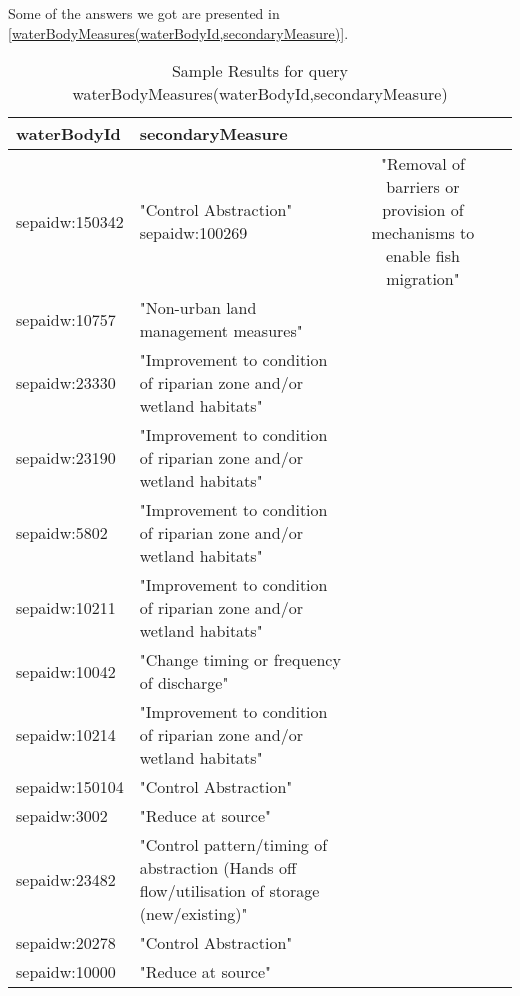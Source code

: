 \documentclass[a4paper,10pt]{article}
\begin{document}
Some of the answers we got are presented in  \ref{waterBodyMeasures(waterBodyId,secondaryMeasure)}. 

\begin{table}[!tb]

\caption{Sample Results for query waterBodyMeasures(waterBodyId,secondaryMeasure)}
\begin{center}
\begin{tabular}{llcr}
\hline
waterBodyId & secondaryMeasure \\ \hline 
sepaidw:150342 & "Control Abstraction"                                                                         
 sepaidw:100269 & "Removal of barriers or provision of mechanisms to enable fish migration"    \\                 
 sepaidw:10757  & "Non-urban land management measures"                                  \\                        
 sepaidw:23330  & "Improvement to condition of riparian zone and/or wetland habitats"     \\                     
sepaidw:23190  & "Improvement to condition of riparian zone and/or wetland habitats"       \\                   
 sepaidw:5802   & "Improvement to condition of riparian zone and/or wetland habitats"     \\                      
 sepaidw:10211  & "Improvement to condition of riparian zone and/or wetland habitats"    \\                       
 sepaidw:10042  & "Change timing or frequency of discharge"                              \\                       
 sepaidw:10214  & "Improvement to condition of riparian zone and/or wetland habitats"     \\                      
 sepaidw:150104 & "Control Abstraction"                                                  \\                       
 sepaidw:3002   & "Reduce at source"                                                    \\                        
 sepaidw:23482  & "Control pattern/timing of abstraction (Hands off flow/utilisation of storage (new/existing)" \\
 sepaidw:20278  & "Control Abstraction"                                                          \\               
 sepaidw:10000  & "Reduce at source"                                                         \\                   

\end{tabular}
\end{center}
\end{table}
\end{document}
